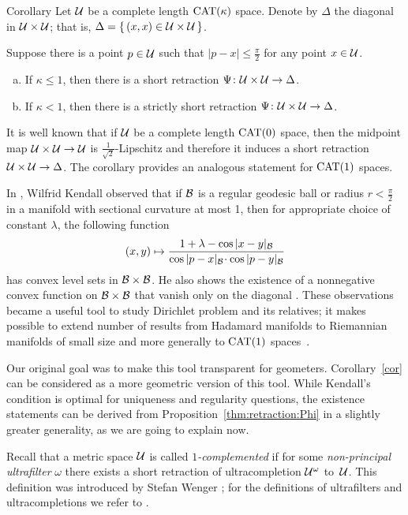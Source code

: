 \documentclass[oneside,a4paper, 12pt]{article}
\begin{document}
\begin{thm}{Corollary}\label{cor}
Let $\mathcal{U}$ be a complete length $\mathrm{CAT}(\kappa)$ space.
Denote by $\Delta$ the diagonal in $\mathcal{U}\times \mathcal{U}$;
that is, $\Delta=\{\,(x,x)\in \mathcal{U}\times \mathcal{U}\,\}$.

Suppose there is a point $p\in \mathcal{U}$ such that $|p-x|\le \tfrac\pi2$ for any point $x\in \mathcal{U}$.
\begin{enumerate}[(a)]
\item
If $\kappa\le 1$, then there is a short retraction $\Psi\colon\mathcal{U}\times \mathcal{U}\to \Delta$.
\item If $\kappa<1$, then there is a strictly short retraction $\Psi\colon\mathcal{U}\times \mathcal{U}\to \Delta$.
\end{enumerate}

\end{thm}

It is well known that if $\mathcal{U}$ be a complete length $\mathrm{CAT}(0)$ space, then the midpoint map $\mathcal{U}\times \mathcal{U}\to \mathcal{U}$ is $\tfrac1{\sqrt{2}}$-Lipschitz and therefore it induces a short retraction $\mathcal{U}\times \mathcal{U}\to\Delta$. 
The corollary provides an analogous statement for $\mathrm{CAT}(1)$ spaces.


In \cite[(4.1)]{kendall}, Wilfrid Kendall observed that if $\mathcal{B}$ is a regular geodesic ball or radius $r<\tfrac\pi2$ in a manifold with sectional curvature at most 1, then for appropriate choice of constant $\lambda$, the following function
\[(x,y)\mapsto 
\frac{1+\lambda-\cos|x-y|_{\spc{B}}}{\cos|p-x|_{\spc{B}}\cdot \cos|p-y|_{\spc{B}}}
\]
has convex level sets in ${\mathcal{B}}\times {\mathcal{B}}$.
He also shows the existence of a nonnegative convex function on ${\mathcal{B}}\times {\mathcal{B}}$ that vanish only on the diagonal \cite[(4.2)]{kendall}.
These observations became a useful tool to study Dirichlet problem and its relatives;
it makes possible to extend number of results from Hadamard manifolds to Riemannian manifolds of small size
and more generally to $\mathrm{CAT}(1)$ spaces~\cite{yokota,BFHMSZ,fuglede,serbinowski}. 

Our original goal was to make this tool transparent for geometers.
Corollary~\ref{cor} can be considered as a more geometric version of this tool.
While Kendall's condition is optimal for uniqueness and regularity questions, the existence statements can be derived from  Proposition~\ref{thm:retraction:Phi} in a
slightly greater generality, as  we are going to explain now.

Recall that a metric space ${\mathcal{U}}$ is called \emph{$1$-complemented} if for some \emph{non-principal ultrafilter} $\omega$  there exists a short retraction of ultracompletion ${\mathcal{U}}^{\omega}$ to~${\mathcal{U}}$.
This definition was introduced by Stefan Wenger \cite{Wenger-1comp};
for the definitions of ultrafilters and ultracompletions we refer to \cite{Wenger-1comp,guo-wenger,akp}. 
\end{document}
